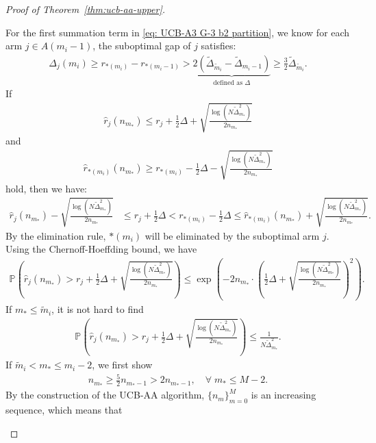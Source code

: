 \documentclass[
  12pt]{article}
\begin{document}
\begin{proof}[Proof of Theorem~\ref{thm:ucb-aa-upper}]
\begin{itemize}
    For the first summation term in \eqref{eq: UCB-A3 G-3 b2 partition}, we know for each arm $j\in A(m_i-1)$, the suboptimal gap of $j$ satisfies:
    \begin{align}
        \Delta_j(m_i)\geq r_{*(m_i)}-r_{*(m_i-1)}>\underbrace{2\left(\tilde{\Delta}_{\tilde{m}_i}-\tilde{\Delta}_{m_i-1}\right)}_{\text{defined as }\Delta}\geq \frac{3}{2}\tilde{\Delta}_{\tilde{m}_i}.
        \label{eq: Delta's lower bound A-3 G-3 b-2}
    \end{align}
    If
\begin{align}
    \hat{r}_j(n_{m_*}) \leq r_j +\frac{1}{2}\Delta +\sqrt{\frac{\log(N \tilde{\Delta}_{m_*}^2)}{2n_{m_*}}} \label{eq: suboptimal is bad A-3 G-3 b2}
\end{align}
and  
\begin{align}
    \hat{r}_{*(m_i)}(n_{m_*}) \geq r_{*(m_i)} -\frac{1}{2}\Delta- \sqrt{\frac{\log(N \tilde{\Delta}_{m_*}^2)}{2n_{m_*}}} 
    \label{eq: optimal is good A-3 G-3 b2}
\end{align}
hold, then we have:  
\begin{align*}
    \hat{r}_j(n_{m_*}) - \sqrt{\frac{\log(N \tilde{\Delta}_{m_*}^2)}{2n_{m_*}}} &\leq r_j + \frac{1}{2}\Delta< r_{*(m_i)} -\frac{1}{2}\Delta \leq \hat{r}_{*(m_i)}(n_{m_*}) + \sqrt{\frac{\log(N \tilde{\Delta}_{m_*}^2)}{2n_{m_*}}}.
\end{align*}
By the elimination rule, \( *(m_i) \) will be eliminated by the suboptimal arm $j$. Using the Chernoff-Hoeffding bound, we have
\begin{align*}
\!\!\!\!\!\!\!\!\!\!\!\!\!\mathbb{P}\left(\hat{r}_j(n_{m_*}) > r_j +\frac{1}{2}\Delta +\sqrt{\frac{\log(N \tilde{\Delta}_{m_*}^2)}{2n_{m_*}}}\right)\leq \exp \left(-2n_{m_*}\cdot \left(\frac{1}{2}\Delta +\sqrt{\frac{\log(N \tilde{\Delta}_{m_*}^2)}{2n_{m_*}}}\right)^2\right).
\end{align*}
If $m_*\leq \tilde{m}_i$, it is not hard to find
\begin{align*}
    \mathbb{P}\left(\hat{r}_j(n_{m_*}) > r_j +\frac{1}{2}\Delta +\sqrt{\frac{\log(N \tilde{\Delta}_{m_*}^2)}{2n_{m_*}}}\right)\leq \frac{1}{N\tilde{\Delta}_{m_*}^2}.
\end{align*}
If $\tilde{m}_i<m_*\leq m_i-2$, we first show 
\begin{align}
    n_{m_*}\geq \frac{5}{2}n_{m_*-1}>2n_{m_*-1},\quad \forall\; m_*\leq M-2.
    \label{eq: n_m doubles}
\end{align}
By the construction of the UCB-AA algorithm, $\{n_m\}_{m=0}^{M}$ is an increasing sequence, which means that

\end{itemize}
\end{proof}
\end{document}
